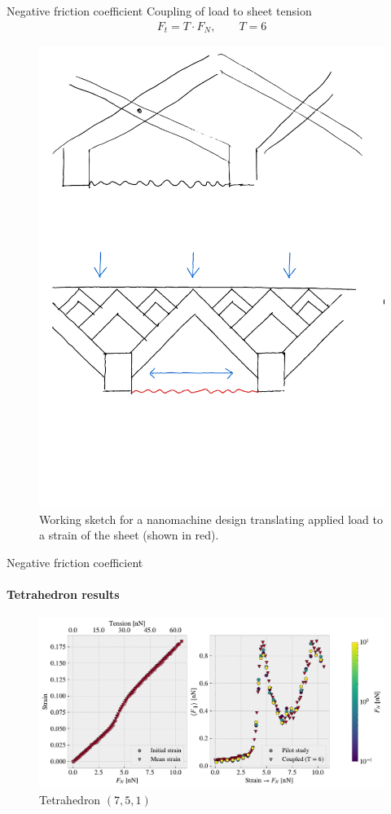 \documentclass[
	10pt, %
]{beamer}
\begin{document}
\begin{frame}{Negative friction coefficient}
	Coupling of load to sheet tension 
	\begin{align*}
		F_t = T\cdot F_N, \qquad T = 6
	\end{align*}
	\begin{figure}[H]
		\centering
		\includegraphics[width=0.6\linewidth]{../thesis/figures/negative_coefficient/nanomachine.pdf}
		\caption{Working sketch for a nanomachine design translating applied load to a strain of the sheet (shown in red).}
		\label{fig:nanomachine}
	\end{figure}	  
\end{frame}
%
%
\begin{frame}{Negative friction coefficient}
	\framesubtitle{Tetrahedron results}
	
	\begin{figure}[H]
		\centering
		\includegraphics[width=\linewidth]{../thesis/figures/negative_coefficient/manual_coupling_tension_pop7_5_1.pdf}	
		\caption{Tetrahedron $(7,5,1)$}
	\end{figure}	
\end{frame}
%
%
\end{document}
